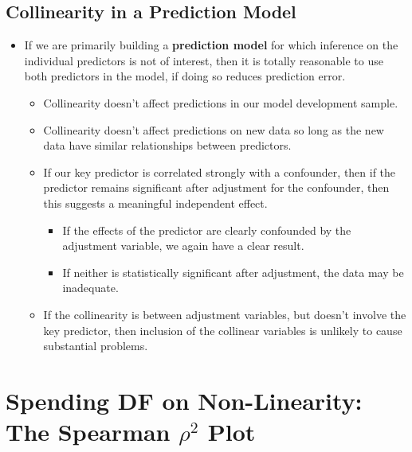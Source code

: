 \documentclass[]{book}
\providecommand{\tightlist}{%
  \setlength{\itemsep}{0pt}\setlength{\parskip}{0pt}}
\theoremstyle{definition}
\theoremstyle{definition}
\theoremstyle{definition}
\theoremstyle{remark}
\begin{document}
\subsection{Collinearity in a Prediction
Model}\label{collinearity-in-a-prediction-model}

\begin{itemize}
\tightlist
\item
  If we are primarily building a \textbf{prediction model} for which
  inference on the individual predictors is not of interest, then it is
  totally reasonable to use both predictors in the model, if doing so
  reduces prediction error.

  \begin{itemize}
  \tightlist
  \item
    Collinearity doesn't affect predictions in our model development
    sample.
  \item
    Collinearity doesn't affect predictions on new data so long as the
    new data have similar relationships between predictors.
  \item
    If our key predictor is correlated strongly with a confounder, then
    if the predictor remains significant after adjustment for the
    confounder, then this suggests a meaningful independent effect.

    \begin{itemize}
    \tightlist
    \item
      If the effects of the predictor are clearly confounded by the
      adjustment variable, we again have a clear result.
    \item
      If neither is statistically significant after adjustment, the data
      may be inadequate.
    \end{itemize}
  \item
    If the collinearity is between adjustment variables, but doesn't
    involve the key predictor, then inclusion of the collinear variables
    is unlikely to cause substantial problems.
  \end{itemize}
\end{itemize}

\section{\texorpdfstring{Spending DF on Non-Linearity: The Spearman
\(\rho^2\)
Plot}{Spending DF on Non-Linearity: The Spearman \textbackslash{}rho\^{}2 Plot}}\label{spending-df-on-non-linearity-the-spearman-rho2-plot}
\end{document}
